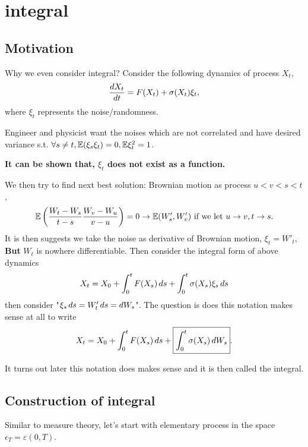 \section{\ito integral}
\subsection{Motivation}
Why we even consider \ito integral? Consider the following dynamics of process $X_t$,
\begin{equation*}
    \frac{\mathop{}\!d X_t}{\mathop{}\!d t} = F(X_t) + \sigma(X_t) \xi_t,
\end{equation*}where $\xi_t$ represents the noise/randomness. 

Engineer and physicist want the noises which are not correlated and have desired variance s.t. $\forall s\neq t, \mathbb{E}(\xi_s \xi_t) = 0, \mathbb{E} \xi_t^2 = 1$.

\begin{center}
    \textbf{It can be shown that, $\xi_t$ does not exist as a function. }
\end{center}

We then try to find next best solution: Brownian motion as process $u < v < s < t$,
\begin{equation*}
    \mathbb{E}\left( \frac{W_t - W_s}{t-s} \frac{W_v - W_u}{v-u}\right) = 0 \to \mathbb{E}(W_s', W_v') \text{ if we let }u\rightarrow v, t\rightarrow s.
\end{equation*} 
It is then suggests we take the noise as derivative of Brownian motion, $\xi_t = W'_t$, \textbf{But} $W_t$ is nowhere differentiable. Then \ito consider the integral form of above dynamics
\begin{equation*}
    X_t = X_0 + \int_0^t F(X_s) \mathop{}\!d s + \int_0^t \sigma(X_s) \xi_s \mathop{}\!d s
\end{equation*}
then consider "$\xi_s \mathop{}\!d s = W_t' \mathop{}\!d s = \mathop{}\!d W_s$". The question is does this notation makes sense at all to write 
\begin{equation*}
    X_t = X_0 + \int_0^t F(X_s) \mathop{}\!d s + \boxed{\int_0^t \sigma(X_s) \mathop{}\!d W_s}.
\end{equation*}

It turns out later this notation does makes sense and it is then called the \ito integral.
\newpage
\subsection{Construction of \ito integral}
Similar to measure theory, let's start with elementary process in the space $\epsilon_T = \varepsilon(0,T)$.

